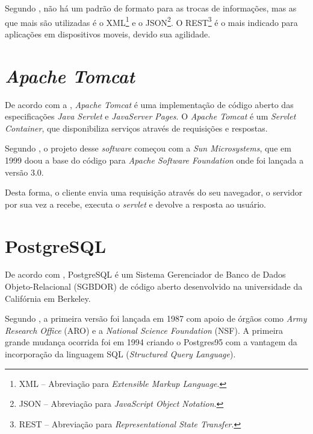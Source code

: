 	\par Segundo , não há um padrão de formato para as
 trocas de informações, mas as que mais são utilizadas é o XML\footnote{XML –
 Abreviação para \textit{Extensible Markup Language}.} e o JSON\footnote{JSON –
 Abreviação para \textit{JavaScript Object Notation}.}. O REST\footnote{REST –
 Abreviação para \textit{Representational State Transfer}.} é o mais indicado
 para aplicações em dispositivos moveis, devido sua agilidade.
	
	
\section{\textit{Apache Tomcat}}

	\par De acordo com a , \textit{Apache Tomcat} é uma
implementação de código aberto das especificações \textit{Java Servlet} e
\textit{JavaServer Pages}. O \textit{Apache Tomcat}  é um \textit{Servlet
Container}, que disponibiliza serviços através de requisições e respostas.
	
	\par Segundo , o projeto desse \textit{software} começou
com a \textit{Sun Microsystems}, que em 1999 doou a base do código para
\textit{Apache Software Foundation} onde foi lançada a versão 3.0.
	
	\par Desta forma, o cliente envia uma requisição através do seu navegador, o
servidor por sua vez a recebe, executa o \textit{servlet} e devolve a resposta
ao usuário.

\section{PostgreSQL}

	\par De acordo com , PostgreSQL é um Sistema
Gerenciador de Banco de Dados Objeto-Relacional (SGBDOR) de código aberto
desenvolvido na universidade da Califórnia em Berkeley.

	\par Segundo , a primeira versão foi lançada em 1987 com apoio
de órgãos como \textit{Army Research Office} (ARO) e a \textit{National Science
Foundation} (NSF). A primeira grande mudança ocorrida foi em 1994 criando o
Postgres95 com a vantagem da incorporação da linguagem SQL (\textit{Structured
Query Language}).

